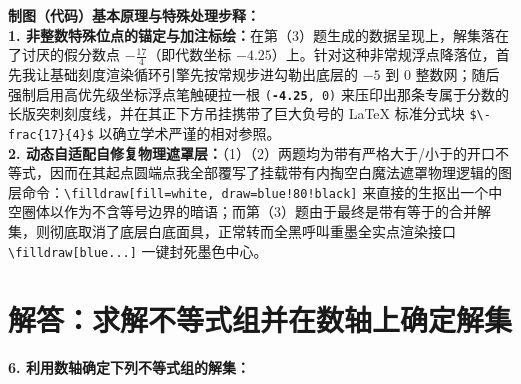 \vspace{0.6cm}

{\small\color{blue!70!black}
\textbf{制图（代码）基本原理与特殊处理步释：}\\
\textbf{1. 非整数特殊位点的锚定与加注标绘：}在第（3）题生成的数据呈现上，解集落在了讨厌的假分数点 $-\frac{17}{4}$（即代数坐标 $-4.25$）上。针对这种非常规浮点降落位，首先我让基础刻度渲染循环引擎先按常规步进勾勒出底层的 $-5$ 到 $0$ 整数网；随后强制启用高优先级坐标浮点笔触硬拉一根 \texttt{(\textbf{-4.25}, 0)} 来压印出那条专属于分数的长版突刺刻度线，并在其正下方吊挂携带了巨大负号的 LaTeX 标准分式块 \texttt{\$\textbackslash -frac\{17\}\{4\}\$} 以确立学术严谨的相对参照。\\
\textbf{2. 动态自适配自修复物理遮罩层：}（1）（2）两题均为带有严格大于/小于的开口不等式，因而在其起点圆端点我全部覆写了挂载带有内掏空白魔法遮罩物理逻辑的图层命令：\texttt{\textbackslash filldraw[fill=white, draw=blue!80!black]} 来直接的生抠出一个中空圈体以作为不含等号边界的暗语；而第（3）题由于最终是带有等于的合并解集，则彻底取消了底层白底面具，正常转而全黑呼叫重墨全实点渲染接口 \texttt{\textbackslash filldraw[blue...]} 一键封死墨色中心。
}

\newpage



\section{解答：求解不等式组并在数轴上确定解集}

\vspace{0.6cm}

\textbf{6. 利用数轴确定下列不等式组的解集：}

\vspace{0.4cm}

